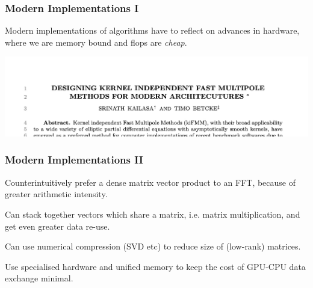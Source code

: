 \begin{frame}
    \frametitle{Modern Implementations I}

    Modern implementations of algorithms have to reflect on advances in hardware, where we are memory bound and flops are \textit{cheap}.

    \includegraphics[width=\linewidth]{assets/upcoming.jpg}

\end{frame}


\begin{frame}
    \frametitle{Modern Implementations II }

    \begin{list}{-}{}
        \item Counterintuitively prefer a dense matrix vector product to an FFT, because of greater arithmetic intensity.
        \item Can stack together vectors which share a matrix, i.e. matrix multiplication, and get even greater data re-use.
        \item Can use numerical compression (SVD etc) to reduce size of (low-rank) matrices.
        \item Use specialised hardware and unified memory to keep the cost of GPU-CPU data exchange minimal.
    \end{list}
\end{frame}

